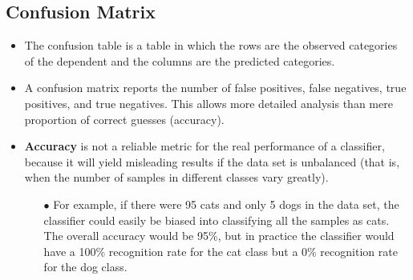\documentclass[]{report}
\begin{document}
\subsection*{Confusion Matrix}
\begin{itemize}
	\item The confusion table is a table in which the rows are the observed categories of
	the dependent and the columns are the predicted categories. 
	\item A confusion matrix reports
	the number of false positives, false negatives, true positives, and true
	negatives. This allows more detailed analysis than mere proportion of correct guesses
	(accuracy). 
	\item \textbf{Accuracy} is not a reliable metric for the real performance of a
	classifier, because it will yield misleading results if the data set is unbalanced
	(that is, when the number of samples in different classes vary greatly).
	\begin{itemize}
		\item[$\bullet$] For example, if there were 95 cats and only 5 dogs in the data set, the
		classifier could easily be biased into classifying all the samples as cats. The
		overall accuracy would be 95\%, but in practice the classifier would have a
		100\% recognition rate for the cat class but a 0\% recognition rate for the dog
		class.
	\end{itemize}
\end{itemize}
\end{document}
